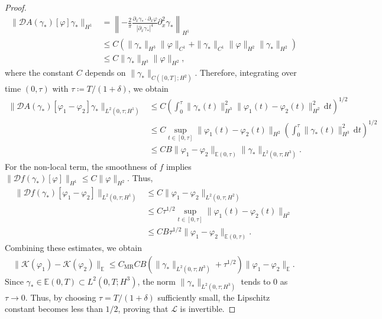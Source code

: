\documentclass{article}
\theoremstyle{remark}
\theoremstyle{definition}
\numberwithin{equation}{section}
\begin{document}
\begin{proof}
\begin{align*}
        \|\mathcal{D}A(\gamma_\ast)[\varphi]\gamma_\ast\|_{H^1}
        &= \left\| -\frac{2}{\pi} \frac{\partial_x \gamma_\ast \cdot \partial_x \varphi}{|\partial_x \gamma_\ast|^4} \partial_x^2 \gamma_\ast \right\|_{H^1} \\
        &\le C \left( \|\gamma_\ast\|_{H^3} \|\varphi\|_{C^1} + \|\gamma_\ast\|_{C^1} \|\varphi\|_{H^2} \|\gamma_\ast\|_{H^2} \right) \\
        &\le C \|\gamma_\ast\|_{H^3} \|\varphi\|_{H^2},
    \end{align*}
    where the constant $C$ depends on $\|\gamma_*\|_{C([0,T]; H^2)}$.
    Therefore, integrating over time $(0, \tau)$ with $\tau \coloneqq T/(1+\delta)$, we obtain
    \begin{align*}
        \|\mathcal{D}A(\gamma_\ast)[\varphi_1 - \varphi_2]\gamma_\ast\|_{L^2(0, \tau; H^1)}
        &\le C \left( \int_0^\tau \|\gamma_\ast(t)\|_{H^3}^2 \|\varphi_1(t) - \varphi_2(t)\|_{H^2}^2 \, \mathrm{d}t \right)^{1/2} \\
        &\le C \sup_{t \in [0,\tau]} \|\varphi_1(t) - \varphi_2(t)\|_{H^2} \left( \int_0^\tau \|\gamma_\ast(t)\|_{H^3}^2 \, \mathrm{d}t \right)^{1/2} \\
        &\le C B \|\varphi_1 - \varphi_2\|_{\mathbb{E}(0,\tau)} \|\gamma_\ast\|_{L^2(0, \tau; H^3)}.
    \end{align*}
    For the non-local term, the smoothness of $f$ implies $\|\mathcal{D}f(\gamma_\ast)[\varphi]\|_{H^1} \le C \|\varphi\|_{H^2}$. Thus,
    \begin{align*}
        \|\mathcal{D}f(\gamma_\ast)[\varphi_1 - \varphi_2]\|_{L^2(0, \tau; H^1)}
        &\le C \|\varphi_1 - \varphi_2\|_{L^2(0, \tau; H^2)} \\
        &\le C \tau^{1/2} \sup_{t \in [0,\tau]} \|\varphi_1(t) - \varphi_2(t)\|_{H^2} \\
        &\le C B \tau^{1/2} \|\varphi_1 - \varphi_2\|_{\mathbb{E}(0,\tau)}.
    \end{align*}
    Combining these estimates, we obtain
    \begin{align*}
        \|\mathcal{K}(\varphi_1) - \mathcal{K}(\varphi_2)\|_{\mathbb{E}}
        \le C_{\mathrm{MR}} C B \left( \|\gamma_\ast\|_{L^2(0, \tau; H^3)} + \tau^{1/2} \right) \|\varphi_1 - \varphi_2\|_{\mathbb{E}}.
    \end{align*}
    Since $\gamma_\ast \in \mathbb{E}(0,T) \subset L^2(0,T;H^3)$, the norm $\|\gamma_\ast\|_{L^2(0, \tau; H^3)}$ tends to $0$ as $\tau \to 0$.
    Thus, by choosing $\tau = T/(1+\delta)$ sufficiently small, the Lipschitz constant becomes less than $1/2$, proving that $\mathcal{L}$ is invertible.
    

\end{proof}
\end{document}
